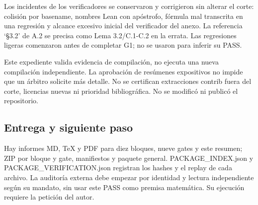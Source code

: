 \documentclass[11pt]{article}
\begin{document}
Los incidentes de los verificadores se conservaron y corrigieron sin
alterar el corte: colisión por basename, nombres Lean con apóstrofo,
fórmula mal transcrita en una regresión y alcance excesivo inicial del
verificador del anexo. La referencia `§3.2' de A.2 se precisa como Lema
3.2/C.1-C.2 en la errata. Las regresiones ligeras comenzaron antes de
completar G1; no se usaron para inferir su PASS.

Este expediente valida evidencia de compilación, no ejecuta una nueva
compilación independiente. La aprobación de resúmenes expositivos no
impide que un árbitro solicite más detalle. No se certifican
extracciones contrib fuera del corte, licencias nuevas ni prioridad
bibliográfica. No se modificó ni publicó el repositorio.

\subsection{Entrega y siguiente paso}\label{entrega-y-siguiente-paso}

Hay informes MD, TeX y PDF para diez bloques, nueve gates y este
resumen; ZIP por bloque y gate, manifiestos y paquete general.
PACKAGE\_INDEX.json y PACKAGE\_VERIFICATION.json registran los hashes y
el replay de cada archivo. La auditoría externa debe empezar por
identidad y lectura independiente según su mandato, sin usar este PASS
como premisa matemática. Su ejecución requiere la petición del autor.
\end{document}
